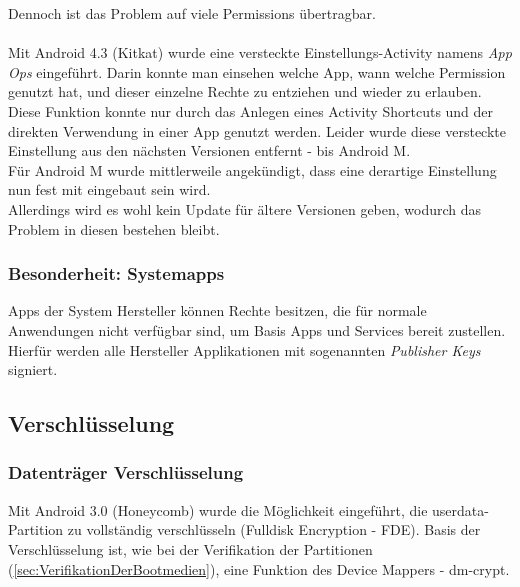 	Dennoch ist das Problem auf viele Permissions übertragbar.\\\\
	Mit Android 4.3 (Kitkat) wurde eine versteckte Einstellungs-Activity namens \textit{App Ops} eingeführt. Darin konnte man einsehen welche App, wann welche Permission genutzt hat, und dieser einzelne Rechte zu entziehen und wieder zu erlauben. Diese Funktion konnte nur durch das Anlegen eines Activity Shortcuts und der direkten Verwendung in einer App genutzt werden. Leider wurde diese versteckte Einstellung aus den nächsten Versionen entfernt - bis Android M. \cite{HiddenActivity} \\
	Für Android M wurde mittlerweile angekündigt, dass eine derartige Einstellung nun fest mit eingebaut sein wird.\cite{AndroidMPermission}\\
	Allerdings wird es wohl kein Update für ältere Versionen geben, wodurch das Problem in diesen bestehen bleibt.
	
	\subsubsection{Besonderheit: Systemapps}
	Apps der System Hersteller können Rechte besitzen, die für normale Anwendungen nicht verfügbar sind, um Basis Apps und Services bereit zustellen. Hierfür werden alle Hersteller Applikationen mit sogenannten \textit{Publisher Keys} signiert.
	
	\subsection{Verschlüsselung}
	\subsubsection{Datenträger Verschlüsselung}
	Mit Android 3.0 (Honeycomb) wurde die Möglichkeit eingeführt, die userdata-Partition zu vollständig verschlüsseln (Fulldisk Encryption - FDE). Basis der Verschlüsselung ist, wie bei der Verifikation der Partitionen (\ref{sec:VerifikationDerBootmedien}), eine Funktion des Device Mappers - dm-crypt. %
	

	
